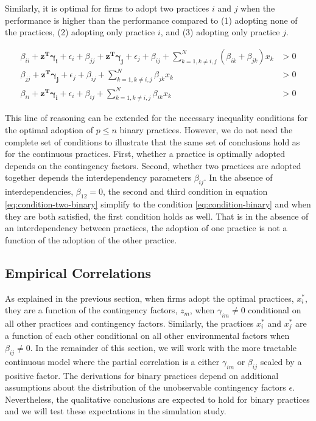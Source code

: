 \documentclass[12pt]{article}
\begin{document}
Similarly, it is optimal for firms to adopt two practices $i$ and $j$ when the performance is higher than the performance compared to (1) adopting none of the practices, (2) adopting only practice $i$, and (3) adopting only practice $j$. 

\begin{equation} \label{eq:condition-two-binary}
    \begin{aligned}
        \beta_{ii} + \mathbf{z^T} \mathbf{\gamma_i} + \epsilon_i
        + \beta_{jj} + \mathbf{z^T} \mathbf{\gamma_j} + \epsilon_j
        + \beta_{ij} + \sum^{N}_{k = 1, k \neq i,j} (\beta_{ik} + \beta_{jk}) x _k &> 0 \\
        \beta_{jj} + \mathbf{z^T} \mathbf{\gamma_j} + \epsilon_j 
        + \beta_{ij} + \sum^{N}_{k = 1, k \neq i,j} \beta_{jk} x_k &> 0 \\
        \beta_{ii} + \mathbf{z^T} \mathbf{\gamma_i} + \epsilon_i
        + \beta_{ij} + \sum^{N}_{k = 1, k \neq i,j} \beta_{ik} x_k &> 0 
    \end{aligned} 
\end{equation}

This line of reasoning can be extended for the necessary inequality conditions for the optimal adoption of $p \leq n$ binary practices. However, we do not need the complete set of conditions to illustrate that the same set of conclusions hold as for the continuous practices. First, whether a practice is optimally adopted depends on the contingency factors. Second, whether two practices are adopted together depends the interdependency parameters $\beta_{ij}$. In the absence of interdependencies, $\beta_{12} = 0$, the second and third condition in equation \eqref{eq:condition-two-binary} simplify to the condition \eqref{eq:condition-binary} and when they are both satisfied, the first condition holds as well. That is in the absence of an interdependency between practices, the adoption of one practice is not a function of the adoption of the other practice.

\subsection{Empirical Correlations}

As explained in the previous section, when firms adopt the optimal practices, $x^*_i$, they are a function of the contingency factors, $z_m$, when $\gamma_{im} \neq 0$ conditional on all other practices and contingency factors. Similarly, the practices $x^*_i$ and $x^*_j$ are a function of each other conditional on all other environmental factors when $\beta_{ij} \neq 0$. In the remainder of this section, we will work with the more tractable continuous model where the partial correlation is a either $\gamma_{im}$ or $\beta_{ij}$ scaled by a positive factor. The derivations for binary practices depend on additional assumptions about the distribution of the unobservable contingency factors $\epsilon$. Nevertheless, the qualitative conclusions are expected to hold for binary practices and we will test these expectations in the simulation study.
\end{document}
